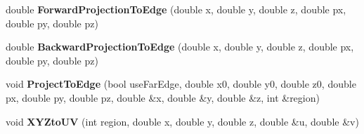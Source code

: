 \begin{DoxyCompactItemize}
\item 
\hypertarget{classANNIEGeometry_a88ff7bd1fcd9ed044c177ebbc875e4af}{
double {\bfseries ForwardProjectionToEdge} (double x, double y, double z, double px, double py, double pz)}
\label{classANNIEGeometry_a88ff7bd1fcd9ed044c177ebbc875e4af}

\item 
\hypertarget{classANNIEGeometry_adcc43a523767429765600b7c103dd5e9}{
double {\bfseries BackwardProjectionToEdge} (double x, double y, double z, double px, double py, double pz)}
\label{classANNIEGeometry_adcc43a523767429765600b7c103dd5e9}

\item 
\hypertarget{classANNIEGeometry_a8b4c2a1c960041a8c36c29c40bde9cb1}{
void {\bfseries ProjectToEdge} (bool useFarEdge, double x0, double y0, double z0, double px, double py, double pz, double \&x, double \&y, double \&z, int \&region)}
\label{classANNIEGeometry_a8b4c2a1c960041a8c36c29c40bde9cb1}

\item 
\hypertarget{classANNIEGeometry_a8b839b45c5eace4880b79d451b6e6f29}{
void {\bfseries XYZtoUV} (int region, double x, double y, double z, double \&u, double \&v)}
\label{classANNIEGeometry_a8b839b45c5eace4880b79d451b6e6f29}

\end{DoxyCompactItemize}
